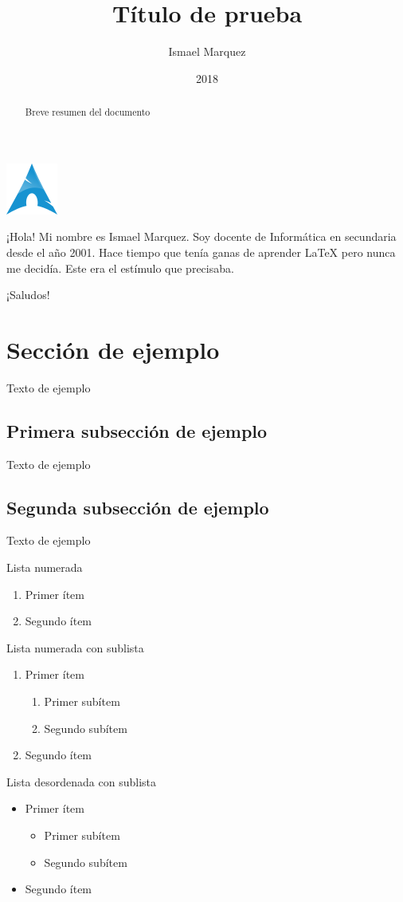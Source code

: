 \documentclass[a4paper,11pt]{article}
\title{\textbf{Título de prueba}}
\author{Ismael Marquez}
\date{2018}
\begin{document}
\maketitle
\thispagestyle{fancy}
\includegraphics[scale=1]{arch.png} 

\begin{abstract}
Breve resumen del documento
\end{abstract}

¡Hola! Mi nombre es Ismael Marquez. Soy docente de Informática en secundaria desde el año 2001. Hace tiempo que tenía ganas de aprender {\LaTeX} pero nunca me decidía. Este era el estímulo que precisaba.

¡Saludos!

\section{Sección de ejemplo}
Texto de ejemplo
\subsection{Primera subsección de ejemplo}
Texto de ejemplo
\subsection{Segunda subsección de ejemplo}
Texto de ejemplo

Lista numerada
\begin{enumerate}
\item Primer ítem
\item Segundo ítem
\end{enumerate}

Lista numerada con sublista
\begin{enumerate}
\item Primer ítem
\begin{enumerate}
\item Primer subítem
\item Segundo subítem
\end{enumerate}
\item Segundo ítem
\end{enumerate}

Lista desordenada con sublista
\begin{itemize}
\item Primer ítem
\begin{itemize}
\item Primer subítem
\item Segundo subítem
\end{itemize}
\item Segundo ítem
\end{itemize}
\end{document}
